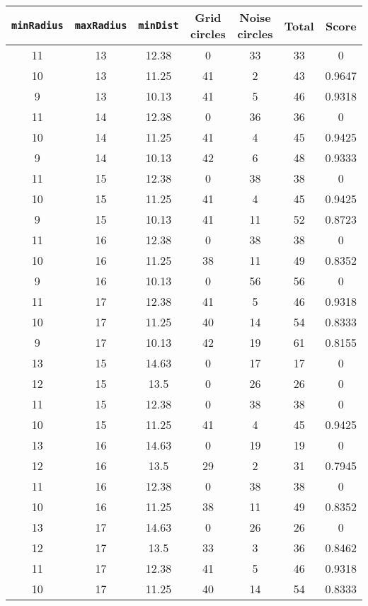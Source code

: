 \documentclass[letterpaper, 12pt]{article}
\begin{document}
\begin{longtable}{|c|c|c|c|c|c|c|}
\hline
\textbf{\texttt{minRadius}} & \textbf{\texttt{maxRadius}} & \textbf{\texttt{minDist}} & \textbf{Grid circles} & \textbf{Noise circles} & \textbf{Total} & \textbf{Score} \\
\hline
11 & 13 & 12.38 & 0 & 33 & 33 & 0 \\
\hline
10 & 13 & 11.25 & 41 & 2 & 43 & 0.9647 \\
\hline
9 & 13 & 10.13 & 41 & 5 & 46 & 0.9318 \\
\hline
11 & 14 & 12.38 & 0 & 36 & 36 & 0 \\
\hline
10 & 14 & 11.25 & 41 & 4 & 45 & 0.9425 \\
\hline
9 & 14 & 10.13 & 42 & 6 & 48 & 0.9333 \\
\hline
11 & 15 & 12.38 & 0 & 38 & 38 & 0 \\
\hline
10 & 15 & 11.25 & 41 & 4 & 45 & 0.9425 \\
\hline
9 & 15 & 10.13 & 41 & 11 & 52 & 0.8723 \\
\hline
11 & 16 & 12.38 & 0 & 38 & 38 & 0 \\
\hline
10 & 16 & 11.25 & 38 & 11 & 49 & 0.8352 \\
\hline
9 & 16 & 10.13 & 0 & 56 & 56 & 0 \\
\hline
11 & 17 & 12.38 & 41 & 5 & 46 & 0.9318 \\
\hline
10 & 17 & 11.25 & 40 & 14 & 54 & 0.8333 \\
\hline
9 & 17 & 10.13 & 42 & 19 & 61 & 0.8155 \\
\hline
13 & 15 & 14.63 & 0 & 17 & 17 & 0 \\
\hline
12 & 15 & 13.5 & 0 & 26 & 26 & 0 \\
\hline
11 & 15 & 12.38 & 0 & 38 & 38 & 0 \\
\hline
10 & 15 & 11.25 & 41 & 4 & 45 & 0.9425 \\
\hline
13 & 16 & 14.63 & 0 & 19 & 19 & 0 \\
\hline
12 & 16 & 13.5 & 29 & 2 & 31 & 0.7945 \\
\hline
11 & 16 & 12.38 & 0 & 38 & 38 & 0 \\
\hline
10 & 16 & 11.25 & 38 & 11 & 49 & 0.8352 \\
\hline
13 & 17 & 14.63 & 0 & 26 & 26 & 0 \\
\hline
12 & 17 & 13.5 & 33 & 3 & 36 & 0.8462 \\
\hline
11 & 17 & 12.38 & 41 & 5 & 46 & 0.9318 \\
\hline
10 & 17 & 11.25 & 40 & 14 & 54 & 0.8333 \\

\end{longtable}
\end{document}
